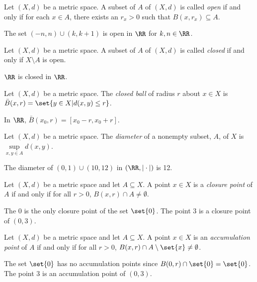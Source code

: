 \begin{definition*}
	Let $(X,d)$ be a metric space.
	A subset of $A$ of $(X,d)$ is called \textit{open} if and only if for each $x\in A$, there exists an $r_x>0$ such that $B(x,r_x)\subseteq A$.
\end{definition*}
\begin{example*}
	The set $(-n, n)\cup (k,k+1)$ is open in $\RR$ for $k,n\in\RR$.
\end{example*}

\begin{definition*}
	Let $(X,d)$ be a metric space.
	A subset of $A$ of $(X,d)$ is called \textit{closed} if and only if $X\setminus A$ is open.
\end{definition*}
\begin{example*}
	$\RR$ is closed in $\RR$.
\end{example*}

\begin{definition*}
	Let $(X,d)$ be a metric space.
	The \textit{closed ball} of radius $r$ about $x\in X$ is $\bar{B}(x,r)=\set{y\in X| d(x,y)\leq r}$.
\end{definition*}
\begin{example*}
	In $\RR$, $\bar{B}(x_0, r)=[x_0-r,x_0+r]$.
\end{example*}

\begin{definition*}
	Let $(X,d)$ be a metric space.
	The \textit{diameter} of a nonempty subset, $A$, of $X$ is $\sup\limits_{x,y\in A}d(x,y)$. 
\end{definition*}
\begin{example*}
	The diameter of $(0,1)\cup(10,12)$ in $(\RR, |\cdot|)$ is 12.
\end{example*}

\begin{definition*}
	Let $(X,d)$ be a metric space and let $A\subseteq X$.
	A point $x\in X$ is a \textit{closure point} of $A$ if and only if for all $r>0$, $B(x,r)\cap A\neq\emptyset$.
\end{definition*}
\begin{example*}
	The $0$ is the only closure point of the set $\set{0}$.
	The point $3$ is a closure point of $(0,3)$.
\end{example*}

\begin{definition*}
	Let $(X,d)$ be a metric space and let $A\subseteq X$.
	A point $x\in X$ is an \textit{accumulation point} of $A$ if and only if for all $r>0$, $B(x,r)\cap A\setminus\set{x}\neq\emptyset$.
\end{definition*}
\begin{example*}
	The set $\set{0}$ has no accumulation points since $B(0,r)\cap\set{0}=\set{0}$.
	The point $3$ is an accumulation point of $(0,3)$.
\end{example*}

